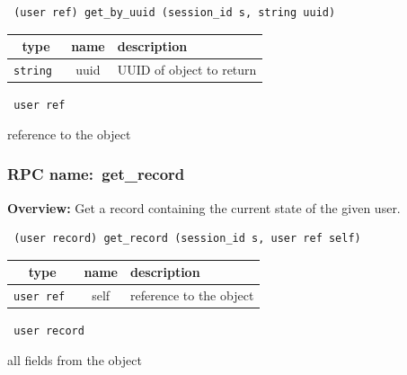 \begin{verbatim} (user ref) get_by_uuid (session_id s, string uuid)\end{verbatim}



 
\vspace{0.3cm}
\begin{tabular}{|c|c|p{7cm}|}
 \hline
{\bf type} & {\bf name} & {\bf description} \\ \hline
{\tt string } & uuid & UUID of object to return \\ \hline 

\end{tabular}

\vspace{0.3cm}

{\tt 
user ref
}


reference to the object
\vspace{0.3cm}
\vspace{0.3cm}
\vspace{0.3cm}
\subsubsection{RPC name:~get\_record}

{\bf Overview:} 
Get a record containing the current state of the given user.

\begin{verbatim} (user record) get_record (session_id s, user ref self)\end{verbatim}



 
\vspace{0.3cm}
\begin{tabular}{|c|c|p{7cm}|}
 \hline
{\bf type} & {\bf name} & {\bf description} \\ \hline
{\tt user ref } & self & reference to the object \\ \hline 

\end{tabular}

\vspace{0.3cm}

{\tt 
user record
}


all fields from the object
\vspace{0.3cm}
\vspace{0.3cm}
\vspace{0.3cm}

